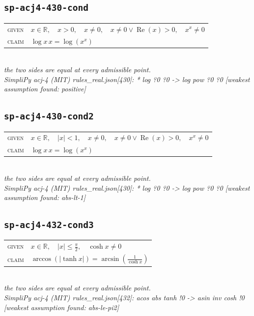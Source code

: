 \documentclass[11pt]{article}
\begin{document}
\subsection*{\texttt{sp-acj4-430-cond}}
\begin{tabular}{@{}l@{\quad}l@{}}
\textsc{given} & $x \in \mathbb{R},\quad x > 0,\quad x \neq 0,\quad x \neq 0 \lor \operatorname{Re}\left(x\right) > 0,\quad x^{x} \neq 0$ \\[4pt]
\textsc{claim} & $\displaystyle \log x \, x = \log\left(x^{x}\right)$ \\
\end{tabular}\\[2pt]
{\small\emph{the two sides are equal at every admissible point.}}\\
\emph{SimpliPy acj-4 (MIT) rules\_real.json[430]: * log ?0 ?0  ->  log pow ?0 ?0  [weakest assumption found: positive]}\\

\subsection*{\texttt{sp-acj4-430-cond2}}
\begin{tabular}{@{}l@{\quad}l@{}}
\textsc{given} & $x \in \mathbb{R},\quad \left|x\right| < 1,\quad x \neq 0,\quad x \neq 0 \lor \operatorname{Re}\left(x\right) > 0,\quad x^{x} \neq 0$ \\[4pt]
\textsc{claim} & $\displaystyle \log x \, x = \log\left(x^{x}\right)$ \\
\end{tabular}\\[2pt]
{\small\emph{the two sides are equal at every admissible point.}}\\
\emph{SimpliPy acj-4 (MIT) rules\_real.json[430]: * log ?0 ?0  ->  log pow ?0 ?0  [weakest assumption found: abs-lt-1]}\\

\subsection*{\texttt{sp-acj4-432-cond3}}
\begin{tabular}{@{}l@{\quad}l@{}}
\textsc{given} & $x \in \mathbb{R},\quad \left|x\right| \le \frac{\pi}{2},\quad \cosh x \neq 0$ \\[4pt]
\textsc{claim} & $\displaystyle \arccos\left(\left|\tanh x\right|\right) = \arcsin\left(\frac{1}{\cosh x}\right)$ \\
\end{tabular}\\[2pt]
{\small\emph{the two sides are equal at every admissible point.}}\\
\emph{SimpliPy acj-4 (MIT) rules\_real.json[432]: acos abs tanh !0  ->  asin inv cosh !0  [weakest assumption found: abs-le-pi2]}\\
\end{document}
